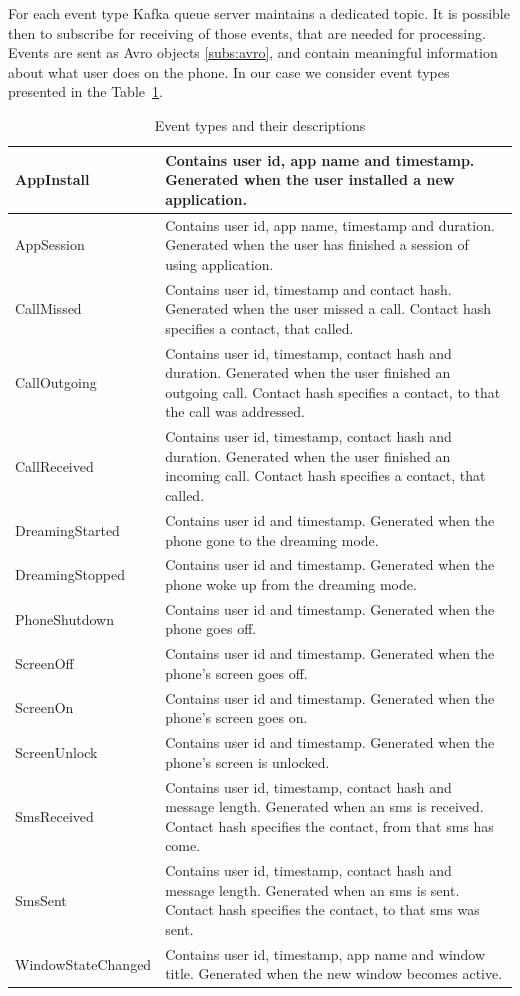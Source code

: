 For each event type Kafka queue server maintains a dedicated topic.
It is possible then to subscribe for receiving of those events, that are needed for processing.
Events are sent as Avro objects \ref{subs:avro}, and contain meaningful information about what user does on the phone.
In our case we consider event types presented in the Table~\ref{table:event_types}.

\begin{table}[h]
\begin{tabular}{ | l | p{10cm} |}
    \hline
    AppInstall & Contains user id, app name and timestamp. Generated when the user installed a new application. \\ \hline
    AppSession & Contains user id, app name, timestamp and duration. Generated when the user has finished a session of using application. \\ \hline
    CallMissed & Contains user id, timestamp and contact hash. Generated when the user missed a call. Contact hash specifies a contact, that called. \\ \hline
    CallOutgoing & Contains user id, timestamp, contact hash and duration. Generated when the user finished an outgoing call. Contact hash specifies a contact, to that the call was addressed. \\ \hline
    CallReceived & Contains user id, timestamp, contact hash and duration. Generated when the user finished an incoming call. Contact hash specifies a contact, that called. \\ \hline
    DreamingStarted & Contains user id and timestamp. Generated when the phone gone to the dreaming mode. \\ \hline
    DreamingStopped & Contains user id and timestamp. Generated when the phone woke up from the dreaming mode. \\ \hline
    PhoneShutdown & Contains user id and timestamp. Generated when the phone goes off. \\ \hline
    ScreenOff & Contains user id and timestamp. Generated when the phone's screen goes off. \\ \hline
    ScreenOn & Contains user id and timestamp. Generated when the phone's screen goes on. \\ \hline
    ScreenUnlock & Contains user id and timestamp. Generated when the phone's screen is unlocked. \\ \hline
    SmsReceived & Contains user id,  timestamp, contact hash and message length. Generated when an sms is received. Contact hash specifies the contact, from that sms has come. \\ \hline
    SmsSent & Contains user id,  timestamp, contact hash and message length. Generated when an sms is sent. Contact hash specifies the contact, to that sms was sent. \\ \hline
    WindowStateChanged & Contains user id, timestamp, app name and window title. Generated when the new window becomes active. \\
    \hline
\end{tabular}
\caption{Event types and their descriptions}
\label{table:event_types}
\end{table}

